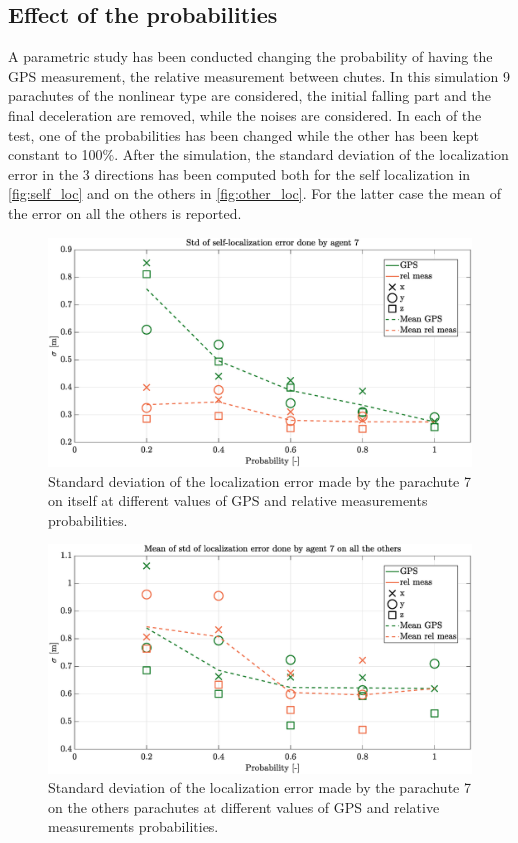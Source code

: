 \subsection{Effect of the probabilities}
A parametric study has been conducted changing the probability of having the GPS measurement, the relative measurement between chutes. In this simulation 9 parachutes of the nonlinear type are considered, the initial falling part and the final deceleration are removed, while the noises are considered. In each of the test, one of the probabilities has been changed while the other has been kept constant to 100\%. After the simulation, the standard deviation of the localization error in the 3 directions has been computed both for the self localization in \autoref{fig:self_loc} and on the others in \autoref{fig:other_loc}. For the latter case the mean of the error on all the others is reported.
\begin{figure}[h]
    \centering
    \includegraphics[width=\columnwidth]{images/mdl2_9chutes_parametric_beforeconsensus.eps}
    \caption{Standard deviation of the localization error made by the parachute 7 on itself at different values of GPS and relative measurements probabilities.}
    \label{fig:self_loc}
\end{figure}
\begin{figure}[h]
    \centering
    \includegraphics[width=\columnwidth]{images/mdl2_9chutes_parametric_loc_others.eps}
    \caption{Standard deviation of the localization error made by the parachute 7 on the others parachutes at different values of GPS and relative measurements probabilities.}
    \label{fig:other_loc}
\end{figure}
